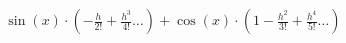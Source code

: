 \documentclass[preview]{standalone}
\begin{document}
\begin{align*}
\sin(x) \cdot \left(-\frac{h}{2!} + \frac{h^3}{4!} \dots \right) + \cos(x) \cdot \left(1 - \frac{h^2}{3!} + \frac{h^4}{5!} \dots \right)
\end{align*}
\end{document}
